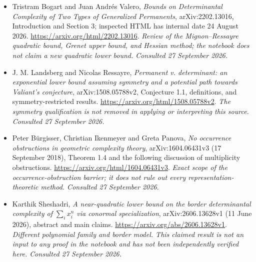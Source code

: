 \documentclass[11pt,a4paper]{article}
\numberwithin{equation}{section}
\begin{document}
\begin{itemize}
\item[\textnormal{[E1]}]\hypertarget{extra:30006699:1}{} Tristram Bogart and Juan Andr\'es Valero, \emph{Bounds on Determinantal Complexity of Two Types of Generalized Permanents}, arXiv:2202.13016, Introduction and Section 3; inspected HTML has internal date 24 August 2026.
\url{https://arxiv.org/html/2202.13016}.
{\small\textit{Review of the Mignon--Ressayre quadratic bound, Grenet upper bound, and Hessian method; the notebook does not claim a new quadratic lower bound. Consulted 27 September 2026.}}
\item[\textnormal{[E2]}]\hypertarget{extra:30006699:2}{} J. M. Landsberg and Nicolas Ressayre, \emph{Permanent v. determinant: an exponential lower bound assuming symmetry and a potential path towards Valiant's conjecture}, arXiv:1508.05788v2, Conjecture 1.1, definitions, and symmetry-restricted results.
\url{https://arxiv.org/html/1508.05788v2}.
{\small\textit{The symmetry qualification is not removed in applying or interpreting this source. Consulted 27 September 2026.}}
\item[\textnormal{[E3]}]\hypertarget{extra:30006699:3}{} Peter B\"urgisser, Christian Ikenmeyer and Greta Panova, \emph{No occurrence obstructions in geometric complexity theory}, arXiv:1604.06431v3 (17 September 2018), Theorem 1.4 and the following discussion of multiplicity obstructions.
\url{https://arxiv.org/html/1604.06431v3}.
{\small\textit{Exact scope of the occurrence-obstruction barrier; it does not rule out every representation-theoretic method. Consulted 27 September 2026.}}
\item[\textnormal{[E4]}]\hypertarget{extra:30006699:4}{} Karthik Sheshadri, \emph{A near-quadratic lower bound on the border determinantal complexity of $\sum_i x_i^n$ via conormal specialization}, arXiv:2606.13628v1 (11 June 2026), abstract and main claims.
\url{https://arxiv.org/abs/2606.13628v1}.
{\small\textit{Different polynomial family and border model. This claimed result is not an input to any proof in the notebook and has not been independently verified here. Consulted 27 September 2026.}}
\end{itemize}
\end{document}
